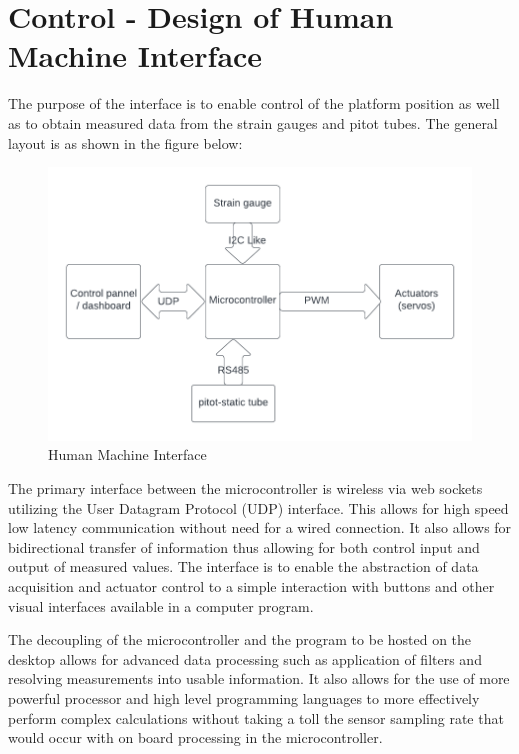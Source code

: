 \section{Control - Design of Human Machine Interface}
The purpose of the interface is to enable control of the platform position as well as to obtain measured data from the strain gauges and pitot tubes. 
The general layout is as shown in the figure below:
\begin{center}
\begin{figure}[H]
\centering
\includegraphics{Figures/Interface}
\caption[Human Machine Interface]{Human Machine Interface}
\end{figure}
\end{center}

The primary interface between the microcontroller is wireless via web sockets utilizing the User Datagram Protocol (UDP) interface. This allows for high speed low latency communication without need for a wired connection. It also allows for bidirectional transfer of information thus allowing for both control input and output of measured values. The interface is to enable the abstraction of data acquisition and actuator control to a simple interaction with buttons and other visual interfaces available in a computer program.

The decoupling of the microcontroller and the program to be hosted on the desktop allows for advanced data processing such as application of filters and resolving measurements into usable information. It also allows for the use of more powerful processor and high level programming languages to more effectively perform complex calculations without taking a toll the sensor sampling rate that would occur with on board processing in the microcontroller.
